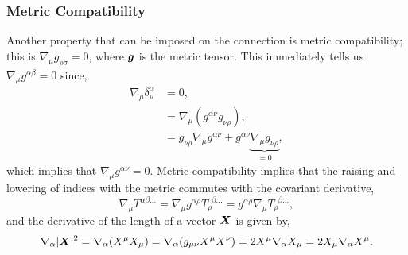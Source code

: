 \subsubsection{Metric Compatibility}
Another property that can be imposed on the connection is metric compatibility; this is $\nabla_\mu g_{\rho\sigma}=0$, where $\boldsymbol{g}$ is the metric tensor. This immediately tells us $\nabla_\mu g^{\alpha\beta}=0$ since, 
\begin{align}
\nabla_\mu \delta^\alpha_\rho &= 0, \\ 
&=  \nabla_\mu(g^{\alpha \nu}g_{\nu \rho}) ,\\
&= g_{\nu \rho}\nabla_\mu g^{\alpha \nu} + g^{\alpha \nu}\underbrace{\nabla_\mu g_{\nu \rho}}_{=0},
\end{align}
which implies that $\nabla_\mu g^{\alpha\nu}=0$. Metric compatibility implies that the raising and lowering of indices with the metric commutes with the covariant derivative,
\begin{equation} \nabla_{\mu} T^{\alpha \beta ...} = \nabla_\mu g^{\alpha\rho}T_{\rho}^{\,\,\,\beta ...} = g^{\alpha\rho} \nabla_\mu T_{\rho}^{\,\,\,\beta ...}, \end{equation}
and the derivative of the length of a vector $\boldsymbol{X}$ is given by,
\begin{equation}
\nabla_\alpha |\boldsymbol{X}|^2=\nabla_\alpha (X^\mu X_\mu) = \nabla_\alpha (g_{\mu\nu}X^\mu X^\nu) = 2 X^\mu \nabla_\alpha X_\mu = 2 X_\mu \nabla_\alpha X^\mu.
\end{equation}


